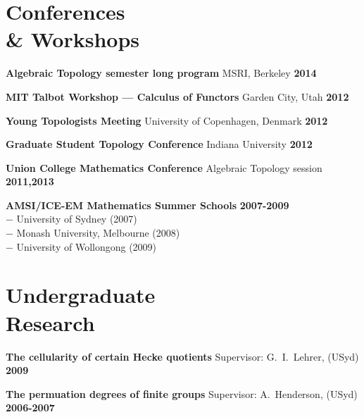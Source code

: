 \documentclass[margin,line]{resume}
\newcommand{\award}[3]{\textbf{#1} #2 \hfill \textbf{#3}
           
\vspace{-2.3mm}}
\newcommand{\twolineaward}[4]{\textbf{#1} #2 \hfill \textbf{#4}\\%
#3
           
\vspace{-2.3mm}}
\begin{document}
\begin{resume}
\vspace{2mm}

\pagebreak

    \section{\mysidestyle Conferences \\ \& Workshops}

\award{Algebraic Topology semester long program}{MSRI, Berkeley}{2014}
\award{MIT Talbot Workshop --- Calculus of Functors}{Garden City, Utah}{2012}
\award{Young Topologists Meeting}{University of Copenhagen, Denmark}{2012}
\award{Graduate Student Topology Conference}{Indiana University}{2012}
\award{Union College Mathematics Conference}{Algebraic Topology session}{2011,2013}
\twolineaward{AMSI/ICE-EM Mathematics Summer Schools}{}{%
\phantom{space}$-$ University of Sydney (2007)\\
\phantom{space}$-$ Monash University, Melbourne (2008)\\
\phantom{space}$-$ University of Wollongong (2009)%
}{2007-2009}

\vspace{2mm}

          \section{\mysidestyle Undergraduate \\ Research}

\award{The cellularity of certain Hecke quotients}{Supervisor: G.\ I.\ Lehrer, (USyd)}{2009}
\award{The permuation degrees of finite groups}{Supervisor: A.\ Henderson, (USyd)}{2006-2007}

\vspace{2mm}
      

\end{resume}
\end{document}
